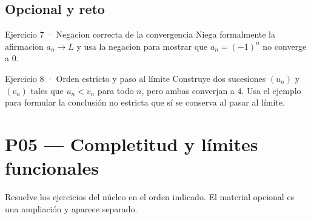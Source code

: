 \documentclass[10pt,a4paper,oneside,openany]{book}
\begin{document}
\section*{Opcional y reto}
\begin{PSevenOptionalFixed}{Ejercicio 7 · Negacion correcta de la convergencia}
Niega formalmente la afirmacion \(a_n\to L\) y usa la negacion para mostrar que \(a_n=(-1)^n\) no converge a \(0\).
\end{PSevenOptionalFixed}
\begin{PSevenOptionalFixed}{Ejercicio 8 · Orden estricto y paso al límite}
Construye dos sucesiones \((u_n)\) y \((v_n)\) tales que \(u_n<v_n\) para todo \(n\), pero ambas converjan a \(4\). Usa el ejemplo para formular la conclusión no estricta que sí se conserva al pasar al límite.
\end{PSevenOptionalFixed}
\chapter{P05 — Completitud y límites funcionales}
Resuelve los ejercicios del núcleo en el orden indicado. El material opcional es una ampliación y aparece separado.
\end{document}
